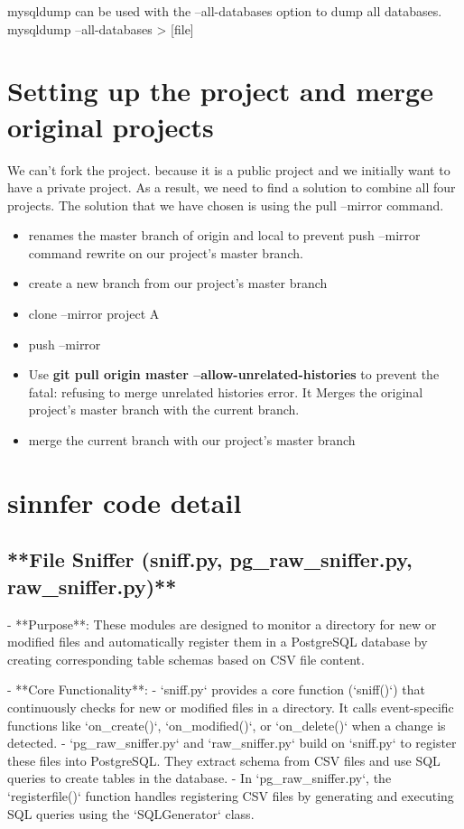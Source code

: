 \documentclass[sigconf,natbib=false]{acmart}
\begin{document}
\begin{draft}
\begin{enumerate}
    mysqldump can be used with the --all-databases option to dump all databases.
    mysqldump --all-databases > [file]
\end{enumerate}

\section{Setting up the project and merge original projects}
 We can't fork the project. because it is a public project and we initially want to have a private project. As a result, we need to find a solution to combine all four projects.
The solution that we have chosen is using the pull --mirror command.
\begin{itemize}
     \item renames the master branch of origin and local to prevent push --mirror command rewrite on our project's master branch.
    \item create a new branch from our project's master branch
    \item clone --mirror project A
    \item push --mirror
    \item Use \textbf{git pull origin master --allow-unrelated-histories} to prevent the fatal: refusing to merge unrelated histories error. It Merges the original project's master branch with the current branch.
    \item merge the current branch with our project's master branch
\end{itemize}

\section{sinnfer code detail}

 
\subsection{ **File Sniffer (sniff.py, pg_raw_sniffer.py, raw_sniffer.py)**}

   - **Purpose**: These modules are designed to monitor a directory for new or modified files and automatically register them in a PostgreSQL database by creating corresponding table schemas based on CSV file content.
   
   - **Core Functionality**: 
     - `sniff.py` provides a core function (`sniff()`) that continuously checks for new or modified files in a directory. It calls event-specific functions like `on_create()`, `on_modified()`, or `on_delete()` when a change is detected.
     - `pg_raw_sniffer.py` and `raw_sniffer.py` build on `sniff.py` to register these files into PostgreSQL. They extract schema from CSV files and use SQL queries to create tables in the database.
     - In `pg_raw_sniffer.py`, the `registerfile()` function handles registering CSV files by generating and executing SQL queries using the `SQLGenerator` class.


\end{draft}
\end{document}
